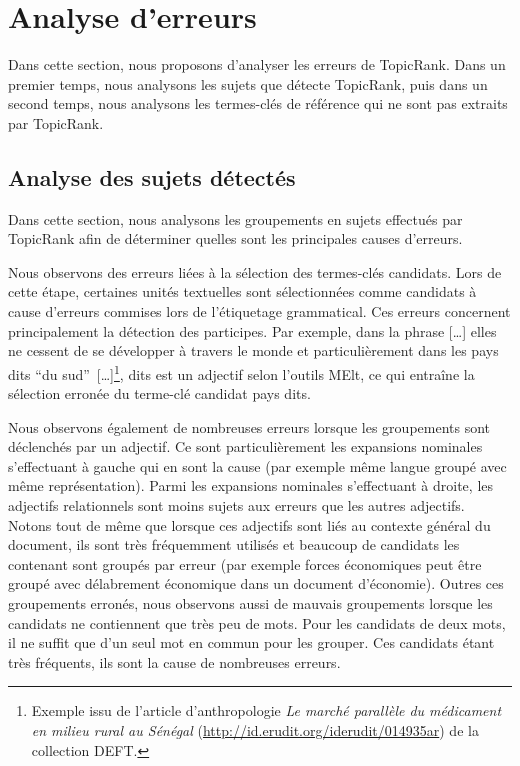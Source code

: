 \section{Analyse d'erreurs}
\label{sec:analyse_d_erreurs}
  Dans cette section, nous proposons d'analyser les erreurs de TopicRank. Dans
  un premier temps, nous analysons les sujets que détecte TopicRank, puis dans
  un second temps, nous analysons les termes-clés de référence qui ne sont pas
  extraits par Topic\-Rank.

  \subsection{Analyse des sujets détectés}
  \label{subsec:analyse_des_sujets_générés}
    Dans cette section, nous analysons les groupements en sujets effectués par
    Topic\-Rank afin de déterminer quelles sont les principales causes
    d'erreurs.

    Nous observons des erreurs liées à la sélection des
    termes-clés candidats. Lors de cette étape, certaines unités textuelles sont
    sélectionnées comme candidats à cause d'erreurs commises lors de l'étiquetage
    grammatical. Ces erreurs concernent principalement la détection des participes. Par exemple, dans la
    phrase \og{}[\dots] elles ne cessent de se développer à travers le monde et
    particulièrement dans les pays dits ``du sud''~[\dots]\fg{}\footnote{Exemple
    issu de l'article d'anthropologie \textit{Le marché parallèle du médicament
    en milieu rural au Sénégal} (\url{http://id.erudit.org/iderudit/014935ar})
    de la collection DEFT.}, \og{}dits\fg{} est un adjectif
    selon l'outils MElt, ce qui entraîne la sélection erronée du terme-clé
    candidat \og{}pays dits\fg{}.

    Nous observons également de nombreuses erreurs lorsque les
    groupements sont déclenchés par un adjectif. Ce sont particulièrement les
    expansions nominales s'effectuant à gauche qui en sont la cause (par exemple
    \og{}même langue\fg{} groupé avec \og{}même représentation\fg{}). Parmi les
    expansions nominales s'effectuant à droite, les adjectifs relationnels sont
    moins sujets aux erreurs que les autres adjectifs. Notons tout de même que
    lorsque ces adjectifs sont liés au contexte général du document, ils sont
    très fréquemment utilisés et beaucoup de candidats les contenant sont
    groupés par erreur (par exemple \og{}forces économiques\fg{} peut être groupé 
    avec \og{}délabrement économique\fg{} dans un document d'économie). Outres
    ces groupements erronés, nous observons aussi de mauvais groupements lorsque
    les candidats ne contiennent que très peu de mots. Pour les candidats de
    deux mots, il ne suffit que d'un seul mot en commun pour les grouper. Ces
    candidats étant très fréquents, ils sont la cause de nombreuses erreurs.

